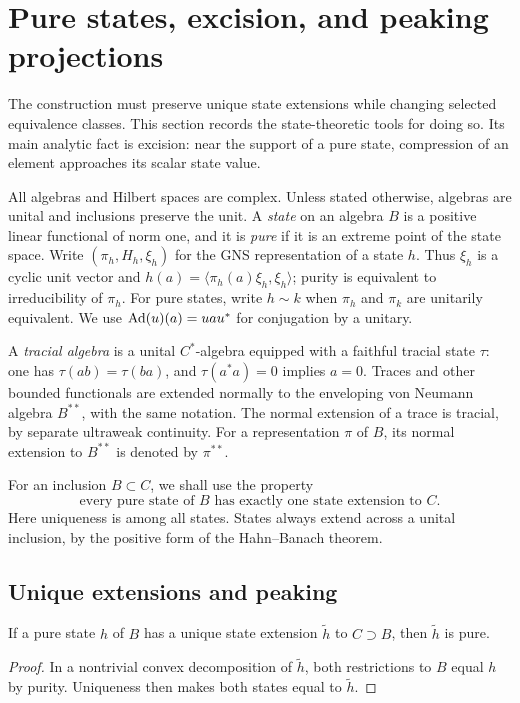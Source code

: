 \section{Pure states, excision, and peaking projections}\label{sec:states}

The construction must preserve unique state extensions while changing selected
equivalence classes.  This section records the state-theoretic tools for doing
so.  Its main analytic fact is excision: near the support of a pure state,
compression of an element approaches its scalar state value.

All algebras and Hilbert spaces are complex.  Unless stated otherwise, algebras
are unital and inclusions preserve the unit.  A \emph{state} on an algebra $B$
is a positive linear functional of norm one, and it is \emph{pure} if it is an
extreme point of the state space.  Write $(\pi_h,H_h,\xi_h)$ for the GNS
representation of a state $h$.  Thus $\xi_h$ is a cyclic unit vector and
$h(a)=\langle\pi_h(a)\xi_h,\xi_h\rangle$; purity is equivalent to
irreducibility of $\pi_h$.  For pure states, write $h\sim k$ when $\pi_h$ and
$\pi_k$ are unitarily equivalent.  We use
$\operatorname{Ad}(u)(a)=uau^*$ for conjugation by a unitary.

A \emph{tracial algebra} is a unital $C^*$-algebra equipped with a faithful
tracial state $\tau$: one has $\tau(ab)=\tau(ba)$, and $\tau(a^*a)=0$ implies
$a=0$.  Traces and other bounded functionals are extended normally to the
enveloping von Neumann algebra $B^{**}$, with the same notation.  The normal
extension of a trace is tracial, by separate ultraweak continuity.
For a representation $\pi$ of $B$, its normal extension to $B^{**}$ is
denoted by $\pi^{**}$.

For an inclusion $B\subset C$, we shall use the property
\begin{equation}\tag{U}\label{eq:U}
 \text{every pure state of $B$ has exactly one state extension to $C$.}
\end{equation}
Here uniqueness is among all states.  States always extend across a unital
inclusion, by the positive form of the Hahn--Banach theorem.

\subsection{Unique extensions and peaking}

\begin{lemma}\label{na:unique-lift}
If a pure state $h$ of $B$ has a unique state extension $\widetilde h$ to
$C\supset B$, then $\widetilde h$ is pure.
\end{lemma}
\begin{proof}
In a nontrivial convex decomposition of $\widetilde h$, both restrictions to
$B$ equal $h$ by purity.  Uniqueness then makes both states equal to
$\widetilde h$.
\end{proof}

